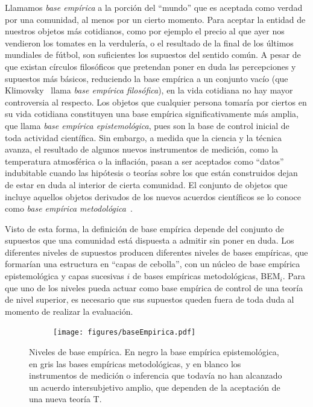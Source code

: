 \documentclass[a4paper,11pt]{book}
\theoremstyle{definition}
\begin{document}
Llamamos \emph{base empírica} a la porción del ``mundo'' que es aceptada como verdad por una comunidad, al menos por un cierto momento.
%
Para aceptar la entidad de nuestros objetos más cotidianos, como por ejemplo el precio al que ayer nos vendieron los tomates en la verdulería, o el resultado de la final de los últimos mundiales de fútbol, son suficientes los supuestos del sentido común.
%
A pesar de que existan círculos filosóficos que pretendan poner en duda las percepciones y supuestos más básicos, reduciendo la base empírica a un conjunto vacío (que Klimovsky~\cite{klimovsky1994-desventuras} llama \emph{base empírica filosófica}), en la vida cotidiana no hay mayor controversia al respecto.
%
Los objetos que cualquier persona tomaría por ciertos en su vida cotidiana constituyen una base empírica significativamente más amplia, que llama \emph{base empírica epistemológica}, pues son la base de control inicial de toda actividad científica.
%
Sin embargo, a medida que la ciencia y la técnica avanza, el resultado de algunos nuevos instrumentos de medición, como la temperatura atmosférica o la inflación, pasan a ser aceptados como ``datos'' indubitable cuando las hipótesis o teorías sobre los que están construidos dejan de estar en duda al interior de cierta comunidad.
%
El conjunto de objetos que incluye aquellos objetos derivados de los nuevos acuerdos científicos se lo conoce como \emph{base empírica metodológica}~\cite{klimovsky1994-desventuras}.


Visto de esta forma, la definición de base empírica depende del conjunto de supuestos que una comunidad está dispuesta a admitir sin poner en duda.
%
Los diferentes niveles de supuestos producen diferentes niveles de bases empíricas, que formarían una estructura en ``capas de cebolla'', con un núcleo de base empírica epistemológica y capas sucesivas $i$ de bases empíricas metodológicas, BEM$_i$.
%
Para que uno de los niveles pueda actuar como base empírica de control de una teoría de nivel superior, es necesario que sus supuestos queden fuera de toda duda al momento de realizar la evaluación.
\begin{figure}[ht!]
    \centering
    \begin{subfigure}[b]{0.48\textwidth}
    \texttt{[image: figures/baseEmpirica.pdf]}
    \end{subfigure}
    \caption{Niveles de base empírica. En negro la base empírica epistemológica, en gris las bases empíricas metodológicas, y en blanco los instrumentos de medición o inferencia que todavía no han alcanzado un acuerdo intersubjetivo amplio, que dependen de la aceptación de una nueva teoría T.}
\end{figure}
\end{document}
